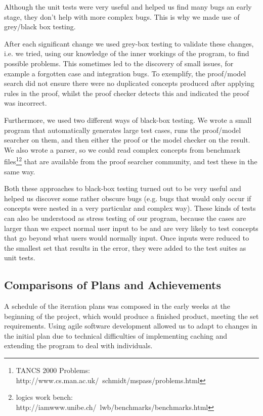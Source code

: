 Although the unit tests were very useful and helped us find many bugs an early stage, they don't help with more complex bugs. This is why we made use of grey/black box testing.

After each significant change we used grey-box testing to validate these changes, i.e. we tried, using our knowledge of the inner workings of the program, to find possible problems. This sometimes led to the discovery of small issues, for example a forgotten case and integration bugs. To exemplify, the proof/model search did not ensure there were no duplicated concepts produced after applying rules in the proof, whilst the proof checker detects this and indicated the proof was incorrect.

Furthermore, we used two different ways of black-box testing. We wrote a small program that automatically generates large test cases, runs the proof/model searcher on them, and then either the proof or the model checker on the result. We also wrote a parser, so we could read complex concepts from benchmark files\footnote{TANCS 2000 Problems: http://www.cs.man.ac.uk/~schmidt/mspass/problems.html}\footnote{logics work bench: http://iamwww.unibe.ch/~lwb/benchmarks/benchmarks.html} that are available from the proof searcher community, and test these in the same way.

Both these approaches to black-box testing turned out to be very useful and helped us discover some rather obscure bugs (e.g. bugs that would only occur if concepts were nested in a very particular and complex way). These kinds of tests can also be understood as stress testing of our program, because the cases are larger than we expect normal user input to be and are very likely to test concepts that go beyond what users would normally input. Once inputs were reduced to the smallest set that results in the error, they were added to the test suites as unit tests.

\subsection{Comparisons of Plans and Achievements}

A schedule of the iteration plans was composed in the early weeks at the beginning of the project, which would produce a finished product, meeting the set requirements. Using agile software development allowed us to adapt to changes in the initial plan due to technical difficulties of implementing caching and extending the program to deal with individuals.

